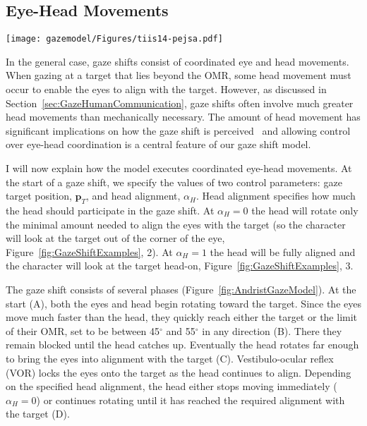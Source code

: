 \subsection{Eye-Head Movements}
\label{sec:GazeShiftHead}

\begin{figure*}
\centering
\texttt{[image: gazemodel/Figures/tiis14-pejsa.pdf]}
\caption{Movement phases of the eyes and head in a gaze shift.}
\label{fig:AndristGazeModel}
\end{figure*}

In the general case, gaze shifts consist of coordinated eye and head movements. When gazing at a target that lies beyond the OMR, some head movement must occur to enable the eyes to align with the target. However, as discussed in Section~\ref{sec:GazeHumanCommunication}, gaze shifts often involve much greater head movements than mechanically necessary. The amount of head movement has significant implications on how the gaze shift is perceived~\citep{andrist2012designing} and allowing control over eye-head coordination is a central feature of our gaze shift model.

I will now explain how the model executes coordinated eye-head movements. At the start of a gaze shift, we specify the values of two control parameters: gaze target position, $\mathbf{p}_T$, and head alignment, $\alpha_H$. Head alignment specifies how much the head should participate in the gaze shift. At $\alpha_H = 0$ the head will rotate only the minimal amount needed to align the eyes with the target (so the character will look at the target out of the corner of the eye, Figure~\ref{fig:GazeShiftExamples}, 2). At $\alpha_H = 1$ the head will be fully aligned and the character will look at the target head-on, Figure~\ref{fig:GazeShiftExamples}, 3.

The gaze shift consists of several phases (Figure~\ref{fig:AndristGazeModel}). At the start (A), both the eyes and head begin rotating toward the target. Since the eyes move much faster than the head, they quickly reach either the target or the limit of their OMR, set to be between 45$^{\circ}$ and 55$^{\circ}$ in any direction (B). There they remain blocked until the head catches up. Eventually the head rotates far enough to bring the eyes into alignment with the target (C). Vestibulo-ocular reflex (VOR) locks the eyes onto the target as the head continues to align. Depending on the specified head alignment, the head either stops moving immediately ($\alpha_H = 0$) or continues rotating until it has reached the required alignment with the target (D).


